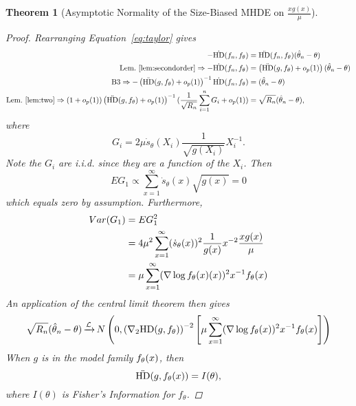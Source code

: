 \documentclass[11 pt]{article}
\newtheorem{thm}{Theorem}
\renewcommand{\th}{\theta}
\newcommand{\xra}[1]{\mathop{ \xrightarrow{#1} }}
\newcommand{\fb}[1]{ \mathop{ \left[ #1 \right] } }
\newcommand{\hell}{\text{HD}}
\newcommand{\dhell}{\dot{\hell}}
\newcommand{\ddhell}{\ddot{\hell}}
\newcommand{\gs}{\frac{xg(x)}{\mu}}
\newcommand{\mhde}{\hat{\th}_n}
\newcommand{\dsth}{\dot{s}_{\theta}}
\newcommand{\fthnx}{f_{\th}}
\begin{document}
\begin{thm}[Asymptotic Normality of the Size-Biased MHDE on $\gs$]
\begin{proof}
Rearranging Equation~\eqref{eq:taylor} gives
\begin{align*}
-\dhell(f_n,f_\th) &= \ddhell(f_n,f_{\th}) (\mhde - \th) \\
\text{Lem.~\ref{lem:secondorder}} \Rightarrow -\dhell(f_n,f_\th) &= \left (\ddhell(g,f_{\th}) + o_p(1) \right) (\mhde - \th) \\
\text{B3} \Rightarrow - \left (\ddhell(g,f_{\th}) + o_p(1) \right)^{-1} \dhell(f_n,f_\th) &=  (\mhde - \th) \\
\text{Lem.~\ref{lem:two}} \Rightarrow (1 + o_p(1))\left (\ddhell(g,f_{\th}) + o_p(1) \right)^{-1} (\frac{1}{\sqrt{R_n}} \sum_{i=1}^n G_i + o_p(1)) &=  \sqrt{R_n}(\mhde - \th), \\
\end{align*}
where
\[
G_i = 2 \mu \dsth(X_i) \frac{1}{\sqrt{g(X_i)}} X_i^{-1}.
\]
Note the $G_i$ are i.i.d. since they are a function of the $X_i$. Then
\[
EG_1 \propto \sum_{x=1}^{\infty} \dsth(x)\sqrt{g(x)} = 0
\]
which equals zero by assumption. Furthermore,
\begin{align*}
Var(G_1) &= EG_1^2 \\
&= 4 \mu^2 \sum_{x=1}^{\infty} (\dsth(x))^2 \frac{1}{g(x)}x^{-2}\gs  \\
&= \mu \sum_{x=1}^{\infty} (\nabla \log \fth(x))^2 x^{-1} \fth   \\
\end{align*}
An application of the central limit theorem then gives
\[
\sqrt{R_n}(\mhde - \th) \xra{\mathcal{L}} N \left (0,  \left( \nabla_2\hell(g,\fthnx) \right )^{-2} \fb{\mu \sum_{x=1}^{\infty} (\nabla \log \fth)^2 x^{-1} \fth} \right)
\]
When $g$ is in the model family $\fth$, then 
\[
\ddhell(g,\fth) = I(\th),
\]
where $I(\th)$ is Fisher's Information for $\fthnx$.
\end{proof}
\end{thm}
\end{document}
